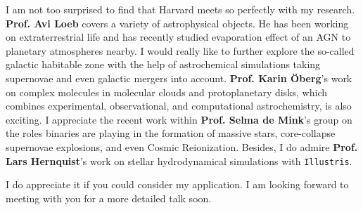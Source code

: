 \documentclass[11pt, a4paper]{awesome-cv} %
\begin{document}
\begin{cvletter}
I am not too surprised to find that Harvard meets so perfectly with my research. \textbf{Prof. Avi Loeb} covers a variety of astrophysical objects. He has been working on extraterrestrial life and has recently studied evaporation effect of an AGN to planetary atmospheres nearby. I would really like to further explore the so-called galactic habitable zone with the help of astrochemical simulations taking supernovae and even galactic mergers into account. \textbf{Prof. Karin Öberg}’s work on complex molecules in molecular clouds and protoplanetary disks, which combines experimental, observational, and computational astrochemistry, is also exciting. I appreciate the recent work within \textbf{Prof. Selma de Mink}’s group on the roles binaries are playing in the formation of massive stars, core-collapse supernovae explosions, and even Cosmic Reionization. Besides, I do admire \textbf{Prof. Lars Hernquist}’s work on stellar hydrodynamical simulations with \texttt{Illustris}.

I do appreciate it if you could consider my application. I am looking forward to meeting with you for a more detailed talk soon.

\end{cvletter}


\end{document}
